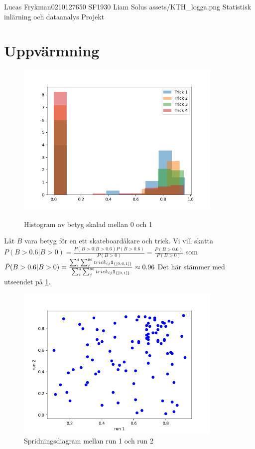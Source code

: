 \documentclass{assignment}
\begin{document}
\assignmentTitle
{Lucas Frykman}{0210127650}
{SF1930}
{Liam Solus}
{assets/KTH_logga.png}
{Statistisk inlärning och dataanalys}
{Projekt}


\section{Uppvärmning}

\begin{figure}[!h]
    \caption{Histogram av betyg skalad mellan 0 och 1}
    \begin{center}
        \includegraphics[width = 99mm]{assets/Figure_2.png} \label{Histogram 1}
    \end{center}
\end{figure}


Låt $B$ vara betyg för en ett skateboardåkare och trick. Vi vill skatta $P(B>0.6|B>0) = \frac{P(B>0|B>0.6)P(B>0.6)}{P(B>0)}=\frac{P(B>0.6)}{P(B>0)}$
som $\tilde{P}(B>0.6|B>0) = \frac{\sum_{i}^4\sum_{j}^{96}trick_{ij}\mathbf{1}_{\{[0.6,1]\}}}{\sum_{i}^4\sum_{j}^{96}trick_{ij}\mathbf{1}_{\{[0,1]\}}} \approx 0.96$
Det här stämmer med utseendet på \cref{Histogram 1}.

\begin{figure}[!h]
    \caption{Spridningsdiagram mellan run 1 och run 2}
    \begin{center}
        \includegraphics[width = 99mm]{assets/Figure_1.png}
    \end{center}
\end{figure}
\end{document}
